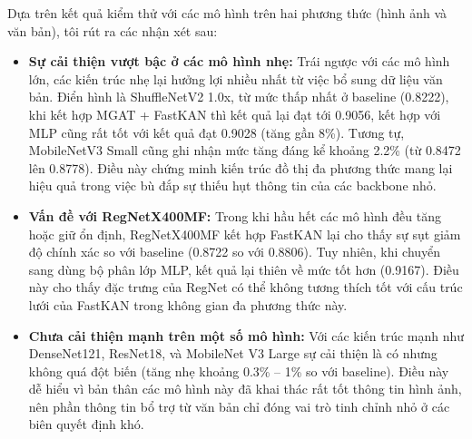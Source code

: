 \indent Dựa trên kết quả kiểm thử với các mô hình trên hai phương thức (hình ảnh và văn bản), tôi rút ra các nhận xét sau: \vspace{-0.1cm}
\begin{itemize}[label={--}, itemsep=1pt]
    \item \textbf{Sự cải thiện vượt bậc ở các mô hình nhẹ:} 
    Trái ngược với các mô hình lớn, các kiến trúc nhẹ lại hưởng lợi nhiều nhất từ việc bổ sung dữ liệu văn bản. Điển hình là ShuffleNetV2 1.0x, từ mức thấp nhất ở baseline (0.8222), khi kết hợp MGAT + FastKAN thì kết quả lại đạt tới 0.9056, kết hợp với MLP cũng rất tốt với kết quả đạt 0.9028 (tăng gần 8\%). Tương tự, MobileNetV3 Small cũng ghi nhận mức tăng đáng kể khoảng 2.2\% (từ 0.8472 lên 0.8778). Điều này chứng minh kiến trúc đồ thị đa phương thức mang lại hiệu quả trong việc bù đắp sự thiếu hụt thông tin của các backbone nhỏ.

    \item \textbf{Vấn đề với RegNetX400MF:}
    Trong khi hầu hết các mô hình đều tăng hoặc giữ ổn định, RegNetX400MF kết hợp FastKAN lại cho thấy sự sụt giảm độ chính xác so với baseline (0.8722 so với 0.8806). Tuy nhiên, khi chuyển sang dùng bộ phân lớp MLP, kết quả lại thiên về mức tốt hơn (0.9167). Điều này cho thấy đặc trưng của RegNet có thể không tương thích tốt với cấu trúc lưới của FastKAN trong không gian đa phương thức này.

    \item \textbf{Chưa cải thiện mạnh trên một số mô hình:} 
    Với các kiến trúc mạnh như DenseNet121, ResNet18, và MobileNet V3 Large sự cải thiện là có nhưng không quá đột biến (tăng nhẹ khoảng 0.3\% -- 1\% so với baseline). Điều này dễ hiểu vì bản thân các mô hình này đã khai thác rất tốt thông tin hình ảnh, nên phần thông tin bổ trợ từ văn bản chỉ đóng vai trò tinh chỉnh nhỏ ở các biên quyết định khó.
\end{itemize}

